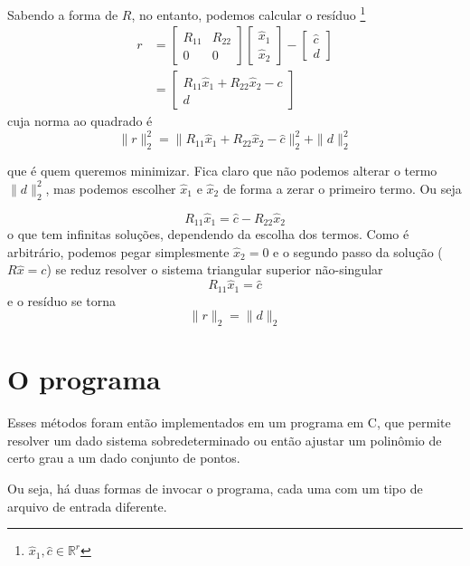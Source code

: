 \documentclass[a4paper,11pt]{article}
\begin{document}
        Sabendo a forma de $R$, no entanto, podemos calcular o resíduo \footnote{$\hat{x}_1, \hat{c} \in \mathbb{R}^{r}$}
        \begin{align*}
            r &=
            \begin{bmatrix}
                R_{11} & R_{22} \\
                     0 &      0
            \end{bmatrix}
            \begin{bmatrix}
                \hat{x}_1 \\
                \hat{x}_2
            \end{bmatrix}
            -
            \begin{bmatrix}
                \hat{c} \\
                d
            \end{bmatrix} \\
            &=
            \begin{bmatrix}
                R_{11}\hat{x}_1 + R_{22}\hat{x}_2 - c \\
                d
            \end{bmatrix}
        \end{align*}
        cuja norma ao quadrado é
        $$ \|r\|_2^2 = \|R_{11}\hat{x}_1 + R_{22}\hat{x}_2 - \hat{c}\|_2^2 + \|d\|_2^2$$

        que é quem queremos minimizar. Fica claro que não podemos alterar o termo $\|d\|_2^2$, mas podemos escolher $\hat{x}_1$ e $\hat{x}_2$ de forma a zerar o primeiro termo. Ou seja

        $$ R_{11}\hat{x}_1 = \hat{c} - R_{22}\hat{x}_2$$
        o que tem infinitas soluções, dependendo da escolha dos termos. Como é arbitrário, podemos pegar simplesmente $\hat{x}_2 = 0$ e o segundo passo da solução ($R\hat{x} = c$) se reduz resolver o sistema triangular superior não-singular
        $$ R_{11}\hat{x}_1 = \hat{c} $$
        e o resíduo se torna
        $$ \|r\|_2 = \|d\|_2 $$

    \section*{O programa}
        Esses métodos foram então implementados em um programa em C, que permite resolver um dado sistema sobredeterminado ou então ajustar um polinômio de certo grau a um dado conjunto de pontos.

        Ou seja, há duas formas de invocar o programa, cada uma com um tipo de arquivo de entrada diferente.
\end{document}
